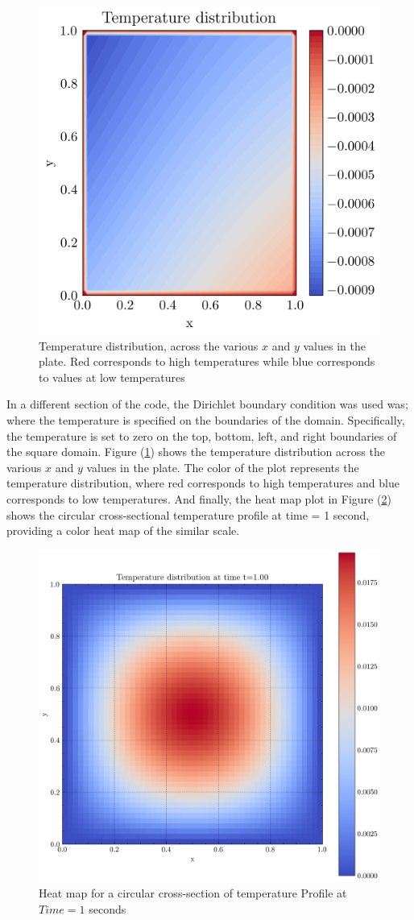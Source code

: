 \begin{figure}[htb!]
\begin{center}
\includegraphics[width=.49\textwidth]{images/temp_dist.png}
\vspace*{-8mm}
\caption{Temperature distribution, across the various $x$ and $y$ values in the plate. Red corresponds to high temperatures while blue corresponds to values at low temperatures}
\label{fig:tmd}
\end{center}
\end{figure}

In a different section of the code, the Dirichlet boundary condition \cite{Sukumar2022}  was used was; where the temperature is specified on the boundaries of the domain. Specifically, the temperature is set to zero on the top, bottom, left, and right boundaries of the square domain. Figure (\ref{fig:tmd}) shows the temperature distribution across the various $x$ and $y$ values in the plate. The color of the plot represents the temperature distribution, where red corresponds to high temperatures and blue corresponds to low temperatures. And finally, the heat map plot in Figure (\ref{fig:t01}) shows the circular cross-sectional temperature profile at time = 1 second, providing a color heat map of the similar scale.  

\begin{figure}[htb!]
\begin{center}
\includegraphics[width=.49\textwidth]{images/teemp_dist_time.png}
\vspace*{-8mm}
\caption{Heat map for a circular cross-section of temperature Profile at $Time = 1$ seconds}
\label{fig:t01}
\end{center}
\end{figure}

